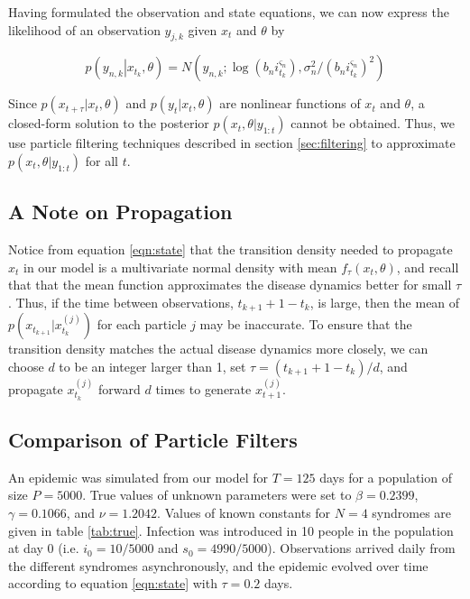 \documentclass{article}
\begin{document}
Having formulated the observation and state equations, we can now express the likelihood of an observation $y_{j,k}$ given $x_t$ and $\theta$ by

\begin{equation}
p\left(y_{n,k}\left|x_{t_k},\theta\right.\right) = N\left(y_{n,k};\log(b_ni_{t_k}^{\varsigma_n}),\sigma_n^2 / (b_ni_{t_k}^{\varsigma_n})^2\right) \label{eqn:lik}
\end{equation}

Since $p(x_{t+\tau}|x_t,\theta)$ and $p(y_t|x_t,\theta)$ are nonlinear functions of $x_t$ and $\theta$, a closed-form solution to the posterior $p(x_t,\theta|y_{1:t})$ cannot be obtained.  Thus, we use particle filtering techniques described in section \ref{sec:filtering} to approximate $p(x_t,\theta|y_{1:t})$ for all $t$.

\subsection{A Note on Propagation}

Notice from equation \eqref{eqn:state} that the transition density needed to propagate $x_t$ in our model is a multivariate normal density with mean $f_\tau(x_t,\theta)$, and recall that that the mean function approximates the disease dynamics better for small $\tau$.  Thus, if the time between observations, $t_{k+1} +1 - t_k$, is large, then the mean of $p(x_{t_{k+1}}|x_{t_k}^{(j)})$ for each particle $j$ may be inaccurate.  To ensure that the transition density matches the actual disease dynamics more closely, we can choose $d$ to be an integer larger than 1, set $\tau = (t_{k+1} + 1 - t_k) / d$, and propagate $x_{t_k}^{(j)}$ forward $d$ times to generate $x_{t+1}^{(j)}$.

\subsection{Comparison of Particle Filters}

An epidemic was simulated from our model for $T = 125$ days for a population of size $P = 5000$.  True values of unknown parameters were set to $\beta = 0.2399$, $\gamma = 0.1066$, and $\nu = 1.2042$.  Values of known constants for $N = 4$ syndromes are given in table \ref{tab:true}.  Infection was introduced in 10 people in the population at day 0 (i.e. $i_0 = 10/5000$ and $s_0 = 4990/5000$).  Observations arrived daily from the different syndromes asynchronously, and the epidemic evolved over time according to equation \eqref{eqn:state} with $\tau = 0.2$ days.
\end{document}
